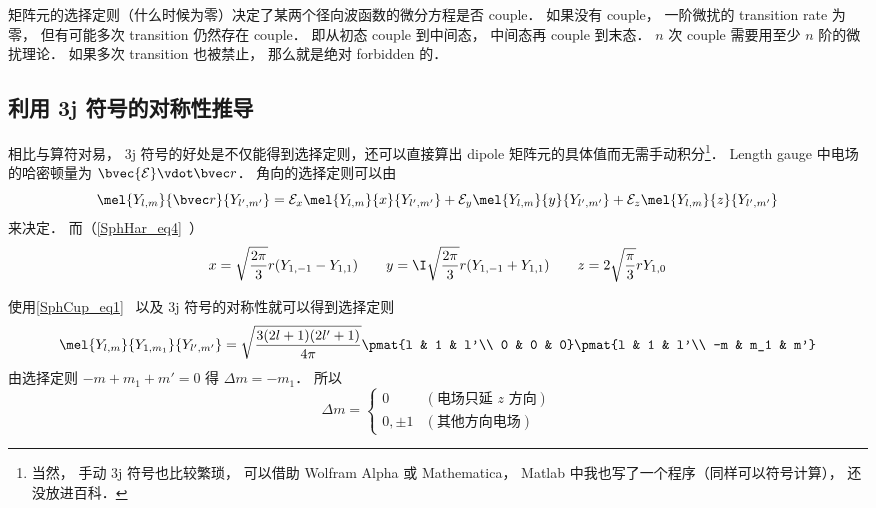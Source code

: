 
\begin{issues}
\issueAbstract
\end{issues}


矩阵元的选择定则（什么时候为零）决定了某两个径向波函数的微分方程是否 couple． 如果没有 couple， 一阶微扰的 transition rate 为零， 但有可能多次 transition 仍然存在 couple． 即从初态 couple 到中间态， 中间态再 couple 到末态． $n$ 次 couple 需要用至少 $n$ 阶的微扰理论． 如果多次 transition 也被禁止， 那么就是绝对 forbidden 的． %

\subsection{利用 3j 符号的对称性推导}
相比与算符对易， 3j 符号的好处是不仅能得到选择定则，还可以直接算出 dipole 矩阵元的具体值而无需手动积分\footnote{当然， 手动 3j 符号也比较繁琐， 可以借助 Wolfram Alpha 或 Mathematica， Matlab 中我也写了一个程序（同样可以符号计算）， 还没放进百科．}． Length gauge 中电场的哈密顿量为 $\bvec{\mathcal{E}}\vdot \bvec r$． 角向的选择定则可以由
\begin{equation}
\mel{Y_{l,m}}{\bvec r}{Y_{l',m'}} = \mathcal{E}_x \mel{Y_{l,m}}{x}{Y_{l',m'}} + \mathcal{E}_y \mel{Y_{l,m}}{y}{Y_{l',m'}} + \mathcal{E}_z \mel{Y_{l,m}}{z}{Y_{l',m'}}
\end{equation}
来决定． 而（\autoref{SphHar_eq4}~）
\begin{equation}
x = \sqrt{\frac{2\pi}{3}} r (Y_{1,-1} - Y_{1,1}) \qquad
y = \I \sqrt{\frac{2\pi}{3}} r (Y_{1,-1}+Y_{1,1}) \qquad
z =2\sqrt{\frac{\pi}{3}} rY_{1,0}
\end{equation}

使用\autoref{SphCup_eq1}~ 以及 3j 符号的对称性就可以得到选择定则
\begin{equation}
\mel{Y_{l,m}}{Y_{1,m_1}}{Y_{l',m'}} = \sqrt{\frac{3(2l+1)(2l'+1)}{4\pi}} \pmat{l & 1 & l'\\ 0 & 0 & 0}\pmat{l & 1 & l'\\ -m & m_1 & m'}
\end{equation}
由选择定则 $-m + m_1 + m' = 0$ 得 $\Delta m = -m_1$． 所以
\begin{equation}
\Delta m =
\begin{cases}
0 & (\text{电场只延 $z$ 方向}) \\
0, \pm 1 & (\text{其他方向电场})
\end{cases}
\end{equation}

